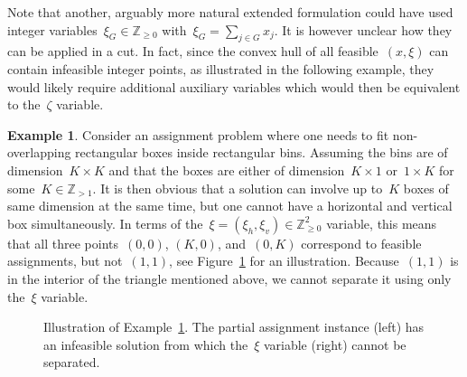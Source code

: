 \documentclass[a4paper,10pt]{article}
\newcommand{\Z}{\mathds{Z}}
\theoremstyle{definition}
\newtheorem{example}[theorem]{Example}
\begin{document}
Note that another, arguably more natural extended formulation could have used integer variables~$\xi_G\in\Z_{\geq 0}$ with~$\xi_G = \sum_{j\in G} x_j$.
It is however unclear how they can be applied in a cut.
In fact, since the convex hull of all feasible~$(x, \xi)$ can contain infeasible integer points, as illustrated in the following example, they would likely require additional auxiliary variables which would then be equivalent to the~$\zeta$ variable.
%
\begin{example}
  \label{example:xi-not-convex}
  Consider an assignment problem where one needs to fit non-overlapping rectangular boxes inside rectangular bins.
  Assuming the bins are of dimension~$K\times K$ and that the boxes are either of dimension~$K\times 1$ or~$1\times K$ for some~$K \in\Z_{>1}$.
  It is then obvious that a solution can involve up to~$K$ boxes of same dimension at the same time, but one cannot have a horizontal and vertical box simultaneously.
  In terms of the~$\xi = (\xi_h, \xi_v)\in\Z^2_{\geq 0}$ variable, this means that all three points~$(0, 0)$, $(K, 0)$, and~$(0, K)$ correspond to feasible assignments, but not~$(1, 1)$, see Figure~\ref{fig:xi-not-convex} for an illustration.
  Because~$(1, 1)$ is in the interior of the triangle mentioned above, we cannot separate it using only the~$\xi$ variable.
\end{example}
%
\begin{figure}[tb]
  \center
  \hspace{1.5cm}
  \caption{
    Illustration of Example~\ref{example:xi-not-convex}.
    The partial assignment instance (left) has an infeasible solution from which the~$\xi$ variable (right) cannot be separated.
  }
    \label{fig:xi-not-convex}
\end{figure}
\end{document}
